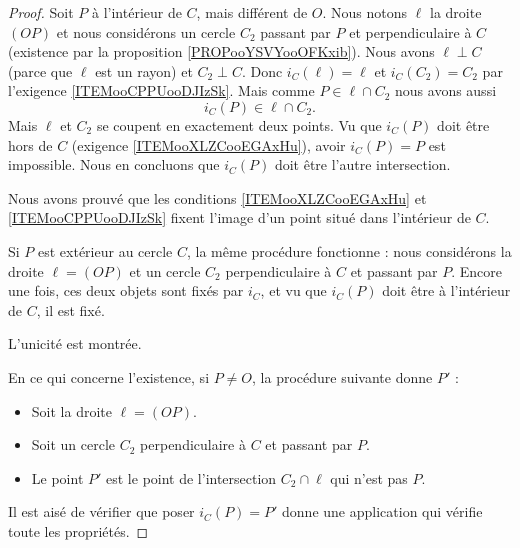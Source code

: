 \begin{proof}
    Soit \( P\) à l'intérieur de \( C\), mais différent de \( O\). Nous notons \( \ell\) la droite \( (OP)\) et nous considérons un cercle \( C_2\) passant par \( P\) et perpendiculaire à \( C\) (existence par la proposition \ref{PROPooYSVYooOFKxib}). Nous avons \( \ell\perp C\) (parce que \( \ell\) est un rayon) et \( C_2\perp C\). Donc \( i_C(\ell)=\ell\) et \( i_C(C_2)=C_2\) par l'exigence \ref{ITEMooCPPUooDJIzSk}. Mais comme \( P\in\ell\cap C_2 \) nous avons aussi
    \begin{equation}
        i_C(P)\in \ell\cap C_2.
    \end{equation}
    Mais \( \ell\) et \( C_2\) se coupent en exactement deux points. Vu que \( i_C(P)\) doit être hors de \( C\) (exigence \ref{ITEMooXLZCooEGAxHu}), avoir \( i_C(P)=P\) est impossible. Nous en concluons que \( i_C(P)\) doit être l'autre intersection.

    Nous avons prouvé que les conditions \ref{ITEMooXLZCooEGAxHu} et \ref{ITEMooCPPUooDJIzSk} fixent l'image d'un point situé dans l'intérieur de \( C\).

    Si \( P\) est extérieur au cercle $C$, la même procédure fonctionne : nous considérons la droite \( \ell=(OP)\) et un cercle \( C_2\) perpendiculaire à \( C\) et passant par \( P\). Encore une fois, ces deux objets sont fixés par \( i_C\), et vu que \( i_C(P)\) doit être à l'intérieur de \( C\), il est fixé.

    L'unicité est montrée.

    En ce qui concerne l'existence, si \( P\neq O\), la procédure suivante donne \( P'\) :
    \begin{itemize}
        \item Soit la droite \( \ell=(OP)\).
        \item Soit un cercle \( C_2\) perpendiculaire à \( C\) et passant par \( P\).
        \item Le point \( P'\) est le point de l'intersection \( C_2\cap\ell\) qui n'est pas \( P\).
    \end{itemize}
    Il est aisé de vérifier que poser \( i_C(P)=P'\) donne une application qui vérifie toute les propriétés.
\end{proof}

